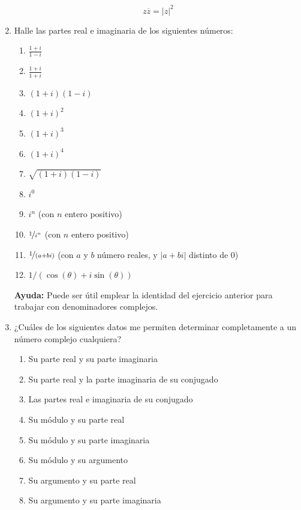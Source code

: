 \documentclass[11pt,spanish]{article}
\begin{document}
\begin{enumerate}
        $$z\overline{z} = |z|^2$$


    \item Halle las partes real e imaginaria de los siguientes números:
    
    \begin{enumerate}
        \item $\frac{1+i}{1-i}$
        \item $\frac{1+i}{1+i}$
        \item $(1+i)(1-i)$
        \item $(1+i)^2$
        \item $(1+i)^3$
        \item $(1+i)^4$
        \item $\sqrt{(1+i)(1-i)}$
        \item $i^0$
        \item $i^n$ (con $n$ entero positivo)
        \item $\nicefrac{1}{i^n}$ (con $n$ entero positivo)
        \item $\nicefrac{1}{(a + bi)}$ (con $a$ y $b$ número reales, y $|a + bi|$ distinto de $0$)	
        \item $1 / (\cos(\theta) + i \sin(\theta))$
    \end{enumerate}
    
    \textbf{Ayuda:} Puede ser útil emplear la identidad del ejercicio anterior para trabajar con denominadores complejos.


    \item ¿Cuáles de los siguientes datos me permiten determinar completamente a un número complejo cualquiera?
    
    \begin{enumerate}
        \item Su parte real y su parte imaginaria
        \item Su parte real y la parte imaginaria de su conjugado
        \item Las partes real e imaginaria de su conjugado
        \item Su módulo y su parte real
        \item Su módulo y su parte imaginaria
        \item Su módulo y su argumento
        \item Su argumento y su parte real
        \item Su argumento y su parte imaginaria
    \end{enumerate}


\end{enumerate}
\end{document}
